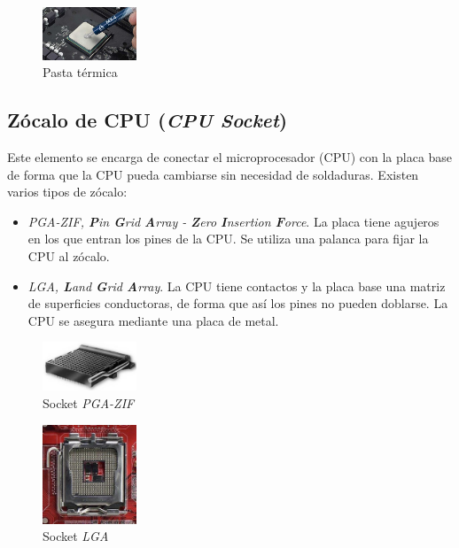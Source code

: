 \documentclass[12pt,spanish]{article}
\begin{document}
\begin{figure}[H]
	\centering
	\includegraphics[width=0.25\textwidth]{thermal.jpg}
	\caption{Pasta térmica}
\end{figure}


\subsection{Zócalo de CPU (\textit{CPU Socket})}

Este elemento se encarga de conectar el microprocesador (CPU) con la placa base de forma que la CPU pueda cambiarse sin necesidad de soldaduras. Existen varios tipos de zócalo:
\begin{itemize}
	\item \textit{PGA-ZIF, \textbf{P}in \textbf{G}rid \textbf{A}rray - \textbf{Z}ero \textbf{I}nsertion \textbf{F}orce}. La placa tiene agujeros en los que entran los pines de la CPU. Se utiliza una palanca para fijar la CPU al zócalo.
	\item \textit{LGA, \textbf{L}and \textbf{G}rid \textbf{A}rray}. La CPU tiene contactos y la placa base una matriz de superficies conductoras, de forma que así los pines no pueden doblarse. La CPU se asegura mediante una placa de metal.
\end{itemize}

\begin{figure}[H]
	\centering
	\includegraphics[width=0.25\textwidth]{pgazif.jpg}
	\caption{Socket \textit{PGA-ZIF}}
\end{figure}
\begin{figure}[H]
	\centering
	\includegraphics[width=0.25\textwidth]{lga.jpeg}
	\caption{Socket \textit{LGA}}
\end{figure}
\end{document}
